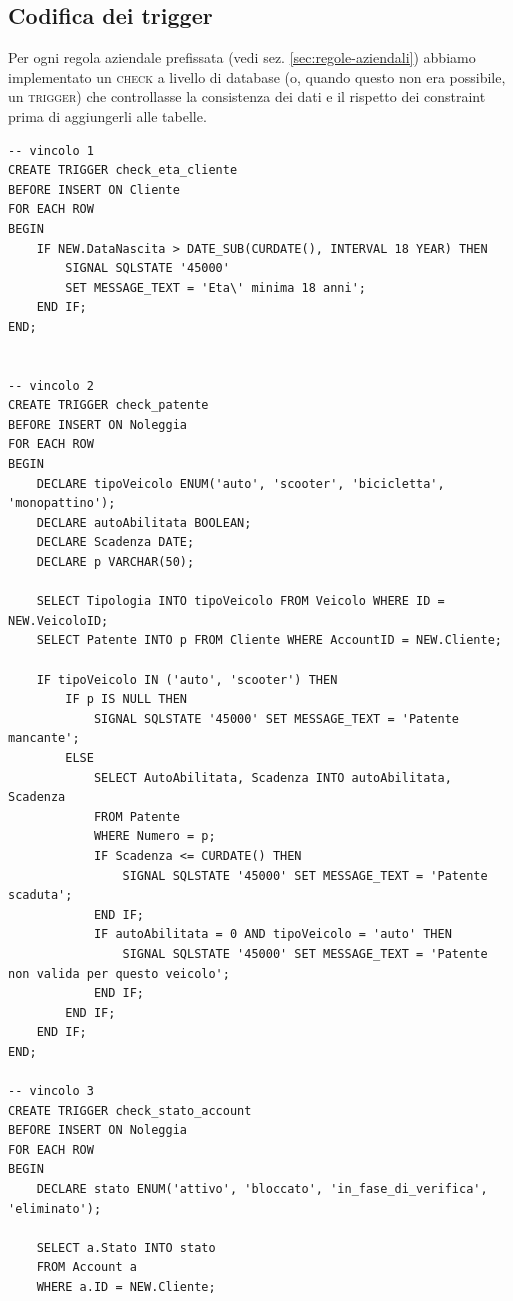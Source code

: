 \documentclass{article}
\begin{document}
\subsection{Codifica dei trigger}

Per ogni regola aziendale prefissata (vedi sez. \ref{sec:regole-aziendali}) abbiamo implementato un \textsc{check} a livello di database (o, quando questo non era possibile, un \textsc{trigger}) che controllasse la consistenza dei dati e il rispetto dei constraint prima di aggiungerli alle tabelle.



\begin{lstlisting}
-- vincolo 1
CREATE TRIGGER check_eta_cliente
BEFORE INSERT ON Cliente
FOR EACH ROW
BEGIN
    IF NEW.DataNascita > DATE_SUB(CURDATE(), INTERVAL 18 YEAR) THEN
        SIGNAL SQLSTATE '45000' 
        SET MESSAGE_TEXT = 'Eta\' minima 18 anni';
    END IF;
END;


-- vincolo 2
CREATE TRIGGER check_patente
BEFORE INSERT ON Noleggia
FOR EACH ROW
BEGIN
    DECLARE tipoVeicolo ENUM('auto', 'scooter', 'bicicletta', 'monopattino');
    DECLARE autoAbilitata BOOLEAN;
    DECLARE Scadenza DATE;
    DECLARE p VARCHAR(50);

    SELECT Tipologia INTO tipoVeicolo FROM Veicolo WHERE ID = NEW.VeicoloID;
    SELECT Patente INTO p FROM Cliente WHERE AccountID = NEW.Cliente;

    IF tipoVeicolo IN ('auto', 'scooter') THEN
        IF p IS NULL THEN
            SIGNAL SQLSTATE '45000' SET MESSAGE_TEXT = 'Patente mancante';
        ELSE
            SELECT AutoAbilitata, Scadenza INTO autoAbilitata, Scadenza
            FROM Patente
            WHERE Numero = p;
            IF Scadenza <= CURDATE() THEN
                SIGNAL SQLSTATE '45000' SET MESSAGE_TEXT = 'Patente scaduta';
            END IF;
            IF autoAbilitata = 0 AND tipoVeicolo = 'auto' THEN
                SIGNAL SQLSTATE '45000' SET MESSAGE_TEXT = 'Patente non valida per questo veicolo';
            END IF;
        END IF;
    END IF;
END;

-- vincolo 3
CREATE TRIGGER check_stato_account
BEFORE INSERT ON Noleggia
FOR EACH ROW
BEGIN
    DECLARE stato ENUM('attivo', 'bloccato', 'in_fase_di_verifica', 'eliminato');
    
    SELECT a.Stato INTO stato
    FROM Account a
    WHERE a.ID = NEW.Cliente;
    

\end{lstlisting}
\end{document}
